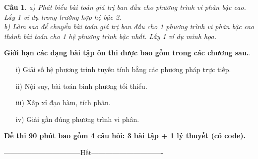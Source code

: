 \documentclass[11pt]{article}
\newtheorem{bt}{Câu}
\begin{document}
\begin{bt}\label{lt13}
a) Phát biểu bài toán giá trị ban đầu cho phương trình vi phân bậc cao. Lấy 1 ví dụ trong trường hợp hệ bậc 2. \\
b) Làm sao để chuyển bài toán giá trị ban đầu cho 1 phương trình vi phân bậc cao thành bài toán cho 1 hệ phương trình bậc nhất. Lấy 1 ví dụ minh họa. 
\end{bt}

\begin{center}
\begin{shaded}
	\textbf{Giới hạn các dạng bài tập ôn thi được bao gồm trong các chương sau.}.
	\begin{enumerate}
		\item[i)] Giải số hệ phương trình tuyến tính bằng các phương pháp trực tiếp. 
		\item[ii)] Nội suy, bài toán bình phương tối thiểu.
		\item[iii)] Xấp xỉ đạo hàm, tích phân.
		\item[iv)] Giải gần đúng phương trình vi phân. \\
	\end{enumerate}
    \textbf{Đề thi 90 phút bao gồm 4 câu hỏi: 3 bài tập + 1 lý thuyết (có code).}
\end{shaded}
\end{center}

\centerline{———————————Hết——————————-}
\end{document}
